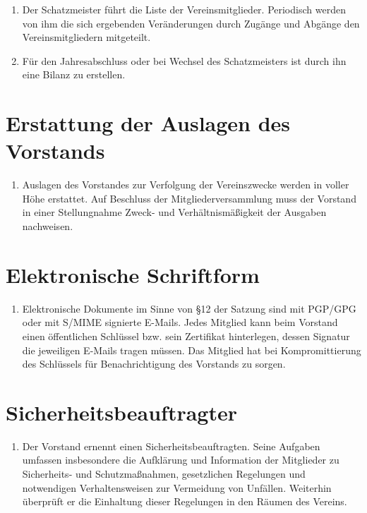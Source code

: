 \documentclass[fontsize=12pt,paper=a4,pagesize,headings=small]{scrartcl}
\begin{document}
\begin{enumerate}
    \item Der Schatzmeister führt die Liste der Vereinsmitglieder.
        Periodisch werden von ihm die sich ergebenden Veränderungen durch
        Zugänge und Abgänge den Vereinsmitgliedern mitgeteilt.

    \item Für den Jahresabschluss oder bei Wechsel des Schatzmeisters ist
        durch ihn eine Bilanz zu erstellen.

\end{enumerate}

\section{Erstattung der Auslagen des Vorstands}

\begin{enumerate}
    \item Auslagen des Vorstandes zur Verfolgung der Vereinszwecke werden
        in voller Höhe erstattet. Auf Beschluss der Mitgliederversammlung
        muss der Vorstand in einer Stellungnahme Zweck- und
        Verhältnismäßigkeit der Ausgaben nachweisen.
\end{enumerate}

\section{Elektronische Schriftform}

\begin{enumerate}
    \item Elektronische Dokumente im Sinne von §12 der Satzung sind mit
        PGP/GPG oder mit S/MIME signierte E-Mails. Jedes Mitglied kann beim
        Vorstand einen öffentlichen Schlüssel bzw. sein Zertifikat
        hinterlegen, dessen Signatur die jeweiligen E-Mails tragen müssen.
        Das Mitglied hat bei Kompromittierung des Schlüssels für
        Benachrichtigung des Vorstands zu sorgen.
\end{enumerate}


\section{Sicherheitsbeauftragter}

\begin{enumerate}
    \item Der Vorstand ernennt einen Sicherheitsbeauftragten. Seine
        Aufgaben umfassen insbesondere die Aufklärung und Information der
        Mitglieder zu Sicherheits- und Schutzmaßnahmen, gesetzlichen
        Regelungen und notwendigen Verhaltensweisen zur Vermeidung von
        Unfällen. Weiterhin überprüft er die Einhaltung dieser Regelungen in
        den Räumen des Vereins.
\end{enumerate}
\end{document}
